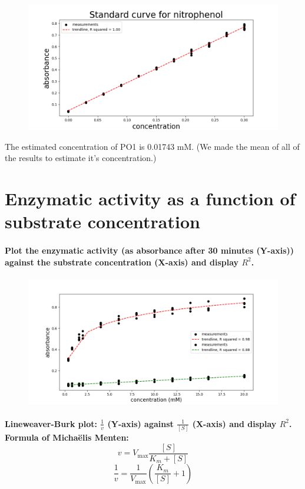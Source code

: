 \documentclass[a4paper,12pt]{article}
\begin{document}
\begin{figure}[!ht]
    \includegraphics[scale=0.5]{fig1.png}
    \centering
\end{figure}

The estimated concentration of PO1 is 0.01743 mM. (We made the mean of all of the results to estimate it's concentration.)

\section{Enzymatic activity as a function of substrate concentration}

\paragraph{Plot the enzymatic activity (as absorbance after 30 minutes (Y-axis)) 
against the substrate concentration (X-axis) and display $R^2$.}

\begin{figure}[!ht]
    \includegraphics[scale=0.5]{fig2_1.png}
    \centering
\end{figure}

\paragraph{Lineweaver-Burk plot: $\frac{1}{v}$ (Y-axis) against $\frac{1}{[S]}$ (X-axis) and display $R^2$. 
Formula of Michaëlis Menten:\[v=V_{\text{max}}\frac{[S]}{K_m+[S]}\] \[\frac{1}{v}=\frac{1}{V_{\text{max}}}\left(\frac{K_m}{[S]}+1\right)\]}
\end{document}
